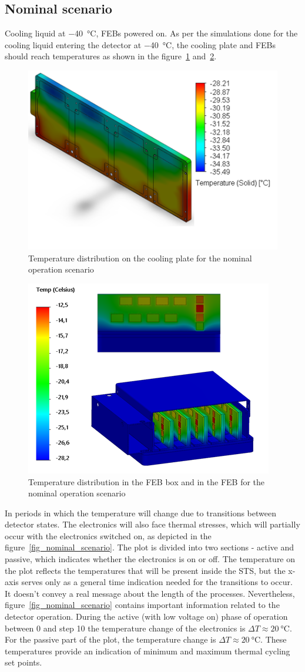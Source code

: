 \subsection{Nominal scenario}
Cooling liquid at \SI{-40}{\celsius}, \gls{FEB}s powered on.
    As per the simulations done for the cooling liquid entering the detector at  \SI{-40}{\celsius}, the cooling plate and \gls{FEB}s should reach temperatures as shown in the figure~\ref{fig_coolinkg_block_nominal} and~\ref{fig_nominal_febs}.
\begin{figure}[!h]
\centering
\includegraphics[width=0.5\columnwidth]{Chapter4/images/cooling_block_nominal.png}
\caption{Temperature distribution on the cooling plate for the nominal operation scenario}
\label{fig_coolinkg_block_nominal}
\end{figure}
\begin{figure}[!h]
\centering
\includegraphics[width=0.5\columnwidth]{Chapter4/images/nominal_febs.png}
\caption{Temperature distribution in the \gls{FEB} box and in the \gls{FEB} for the nominal operation scenario}
\label{fig_nominal_febs}
\end{figure}
In periods in which the temperature will change due to transitions between detector states. The electronics will also face thermal stresses, which will partially occur with the electronics switched on, as depicted in the figure~\ref{fig_nominal_scenario}. The plot is divided into two sections - active and passive, which indicates whether the electronics is on or off. The temperature on the plot reflects the temperatures that will be present inside the \gls{STS}, but the x-axis serves only as a general time indication needed for the transitions to occur. It doesn't convey a real message about the length of the processes. Nevertheless, figure~\ref{fig_nominal_scenario} contains important information related to the detector operation. During the active (with low voltage on) phase of operation between 0 and step 10 the temperature change of the electronics is $\Delta T \approx \SI{20}{\celsius}$. For the passive part of the plot, the temperature change is $\Delta T \approx \SI{20}{\celsius}$. These temperatures provide an indication of minimum and maximum thermal cycling set points.  
